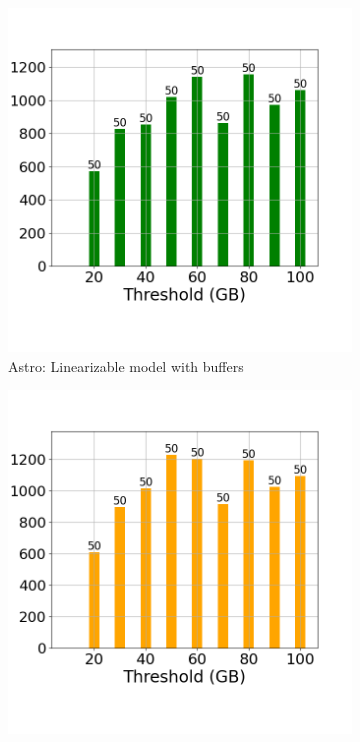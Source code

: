 \begin{figure}
	\centering
	\begin{subfigure}[c]{0.48\textwidth}
		\includegraphics[width=1\textwidth]   {figures/Experiments/Dynamic/ASTRO/Batch_processing/70/average_query_time_per_batch_version_999777015_10485760_10_delay[70].png}
		\caption{Astro: Linearizable model with buffers}
		\label{fig:logical-ts-70-astro}
	\end{subfigure}
	\begin{subfigure}[c]{0.48\textwidth}
		\includegraphics[width=1\textwidth]	 {figures/Experiments/Dynamic/ASTRO/Batch_processing/70/average_query_time_per_batch_version_999777018_10485760_10_delay[70].png}

\end{subfigure}
\end{figure}
